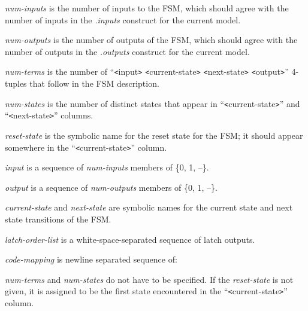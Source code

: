 {\begin{pespace}
\begin{description}
\item {\em num-inputs} is the number of inputs to the FSM, which should
agree with the number of inputs in the {\em .inputs} construct for the
current model.

\item {\em num-outputs} is the number of outputs of the FSM, which should
agree with the number of outputs in the {\em .outputs} construct for the
current model.

\item {\em num-terms} is the number of ``{\verb|<|}input{\verb|>|}
{\verb|<|}current-state{\verb|>|} {\verb|<|}next-state{\verb|>|}
{\verb|<|}output{\verb|>|}'' 4-tuples that follow in the FSM description.

\item {\em num-states} is the number of distinct states that appear in
``{\verb|<|}current-state{\verb|>|}'' and ``{\verb|<|}next-state{\verb|>|}''
columns.

\item {\em reset-state} is the symbolic name for the reset state for the
FSM; it should appear somewhere in the ``{\verb|<|}current-state{\verb|>|}''
column.

\item {\em input} is a sequence of {\em num-inputs} members of \{0, 1, --\}.

\item {\em output} is a sequence of {\em num-outputs} members of \{0, 1, --\}.

\item {\em current-state} and {\em next-state} are symbolic names for the
current state and next state transitions of the FSM.

\item {\em latch-order-list} is a white-space-separated sequence of latch
outputs.

\item {\em code-mapping} is newline separated sequence of:
\end{description}

{\em num-terms} and {\em num-states} do not have to be specified.  If the
{\em reset-state} is not given, it is assigned to be the first state
encountered in the ``{\verb|<|}current-state{\verb|>|}'' column.


\end{pespace}}
